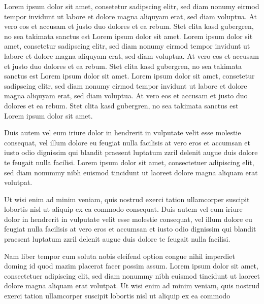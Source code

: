 \documentclass[a4paper]{infoblatt}
\begin{document}
Lorem ipsum dolor sit amet, consetetur sadipscing elitr, sed diam nonumy eirmod tempor invidunt ut labore et dolore magna aliquyam erat, sed diam voluptua. At vero eos et accusam et justo duo dolores et ea rebum. Stet clita kasd gubergren, no sea takimata sanctus est Lorem ipsum dolor sit amet. Lorem ipsum dolor sit amet, consetetur sadipscing elitr, sed diam nonumy eirmod tempor invidunt ut labore et dolore magna aliquyam erat, sed diam voluptua. At vero eos et accusam et justo duo dolores et ea rebum. Stet clita kasd gubergren, no sea takimata sanctus est Lorem ipsum dolor sit amet. Lorem ipsum dolor sit amet, consetetur sadipscing elitr, sed diam nonumy eirmod tempor invidunt ut labore et dolore magna aliquyam erat, sed diam voluptua. At vero eos et accusam et justo duo dolores et ea rebum. Stet clita kasd gubergren, no sea takimata sanctus est Lorem ipsum dolor sit amet.   

Duis autem vel eum iriure dolor in hendrerit in vulputate velit esse molestie consequat, vel illum dolore eu feugiat nulla facilisis at vero eros et accumsan et iusto odio dignissim qui blandit praesent luptatum zzril delenit augue duis dolore te feugait nulla facilisi. Lorem ipsum dolor sit amet, consectetuer adipiscing elit, sed diam nonummy nibh euismod tincidunt ut laoreet dolore magna aliquam erat volutpat.   

Ut wisi enim ad minim veniam, quis nostrud exerci tation ullamcorper suscipit lobortis nisl ut aliquip ex ea commodo consequat. Duis autem vel eum iriure dolor in hendrerit in vulputate velit esse molestie consequat, vel illum dolore eu feugiat nulla facilisis at vero eros et accumsan et iusto odio dignissim qui blandit praesent luptatum zzril delenit augue duis dolore te feugait nulla facilisi.   

Nam liber tempor cum soluta nobis eleifend option congue nihil imperdiet doming id quod mazim placerat facer possim assum. Lorem ipsum dolor sit amet, consectetuer adipiscing elit, sed diam nonummy nibh euismod tincidunt ut laoreet dolore magna aliquam erat volutpat. Ut wisi enim ad minim veniam, quis nostrud exerci tation ullamcorper suscipit lobortis nisl ut aliquip ex ea commodo

   
\end{document}
